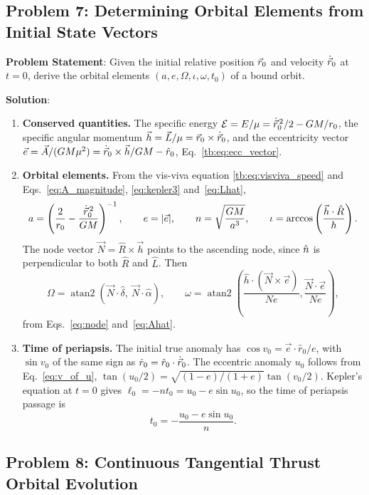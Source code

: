 \subsection{Problem 7: Determining Orbital Elements from Initial State Vectors}

\textbf{Problem Statement}: Given the initial relative position $\vec r_0$ and velocity $\dot{\vec r}_0$ at $t=0$, derive the orbital elements $(a, e, \Omega, \iota, \omega, t_0)$ of a bound orbit.

\textbf{Solution}:
\begin{enumerate}[label=(\alph*)]
	\item \textbf{Conserved quantities.} The specific energy $\mathcal E=E/\mu = \dot{\vec r}_0^{\,2}/2 - GM/r_0$, the specific angular momentum $\vec h = \vec L/\mu=\vec r_0 \times \dot{\vec r}_0$, and the eccentricity vector $\vec e=\vec A/(GM\mu^2) = \dot{\vec r}_0 \times \vec h/GM - \hat r_0$, Eq.~\eqref{tb:eq:ecc_vector}.
	\item \textbf{Orbital elements.} From the vis-viva equation \eqref{tb:eq:visviva_speed} and Eqs.~\eqref{eq:A_magnitude}, \eqref{eq:kepler3} and~\eqref{eq:Lhat},
	\[
	a = \left(\frac{2}{r_0} - \frac{\dot{\vec r}_0^{\,2}}{GM}\right)^{-1}, \qquad e = |\vec e|, \qquad n = \sqrt{\frac{GM}{a^3}}, \qquad \iota = \arccos\left(\frac{\vec h\cdot\hat R}{h}\right).
	\]
	The node vector $\vec N = \hat R \times \vec h$ points to the ascending node, since $\hat n$ is perpendicular to both $\hat R$ and $\hat L$. Then
	\[
	\Omega = \operatorname{atan2}(\vec N\cdot\hat\delta,\ \vec N\cdot\hat\alpha), \qquad \omega = \operatorname{atan2}\left(\frac{\hat h \cdot (\vec N \times \vec e)}{Ne}, \frac{\vec N \cdot \vec e}{Ne}\right),
	\]
	from Eqs.~\eqref{eq:node} and~\eqref{eq:Ahat}.
	\item \textbf{Time of periapsis.} The initial true anomaly has $\cos v_0=\vec e\cdot\hat r_0/e$, with $\sin v_0$ of the same sign as $\dot r_0=\hat r_0\cdot\dot{\vec r}_0$. The eccentric anomaly $u_0$ follows from Eq.~\eqref{eq:v_of_u}, $\tan(u_0/2)=\sqrt{(1-e)/(1+e)}\tan(v_0/2)$. Kepler's equation at $t=0$ gives $\ell_0=-nt_0=u_0-e\sin u_0$, so the time of periapsis passage is
	\[
	t_0 = -\frac{u_0 - e\sin u_0}{n}.
	\]
\end{enumerate}

\subsection{Problem 8: Continuous Tangential Thrust Orbital Evolution}

